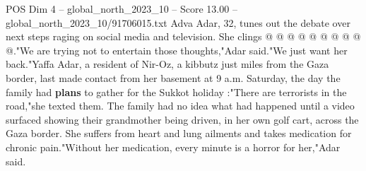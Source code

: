 \begin{textsample}{POS Dim 4 – global\_north\_2023\_10 – Score 13.00 – global\_north\_2023\_10/91706015.txt}
Adva Adar, 32, tunes out the debate over next steps raging on social media and television.
She clings @ @ @ @ @ @ @ @ @ @."We are trying not to entertain those thoughts,"Adar said."We just want her back."Yaffa Adar, a resident of Nir-Oz, a kibbutz just miles from the Gaza border, last made contact from her basement at 9 a.m.
Saturday, the day the family had \textbf{plans} to gather for the Sukkot holiday :"There are terrorists in the road,"she texted them.
The family had no idea what had happened until a video surfaced showing their grandmother being driven, in her own golf cart, across the Gaza border.
She suffers from heart and lung ailments and takes medication for chronic pain."Without her medication, every minute is a horror for her,"Adar said.

\end{textsample}
